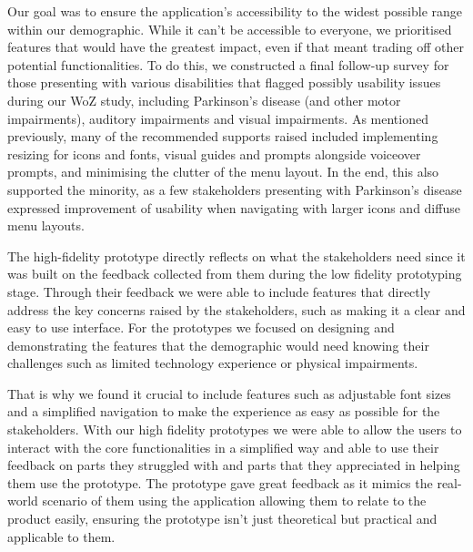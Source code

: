 \documentclass[12pt,a4paper]{article}
\begin{document}
Our goal was to ensure the application’s accessibility to the widest possible range within our demographic. While it can't be accessible to everyone, we prioritised features that would have the greatest impact, even if that meant trading off other potential functionalities. To do this, we constructed a final follow-up survey for those presenting with various disabilities that flagged possibly usability issues during our WoZ study, including Parkinson’s disease (and other motor impairments), auditory impairments and visual impairments. As mentioned previously, many of the recommended supports raised included implementing resizing for icons and fonts, visual guides and prompts alongside voiceover prompts, and minimising the clutter of the menu layout. In the end, this also supported the minority, as a few stakeholders presenting with Parkinson's disease expressed improvement of usability when navigating with larger icons and diffuse menu layouts. 

The high-fidelity prototype directly reflects on what the stakeholders need since it was built on the feedback collected from them during the low fidelity prototyping stage. Through their feedback we were able to include features that directly address the key concerns raised by the stakeholders, such as making it a clear and easy to use interface. For the prototypes we focused on designing and demonstrating the features that the demographic would need knowing their challenges such as limited technology experience or physical impairments. 

 That is why we found it crucial to include features such as adjustable font sizes and a simplified navigation to make the experience as easy as possible for the stakeholders. With our high fidelity prototypes we were able to allow the users to interact with the core functionalities in a simplified way and able to use their feedback on parts they struggled with and parts that they appreciated in helping them use the prototype. The prototype gave great feedback as it mimics the real-world scenario of them using the application allowing them to relate to the product easily, ensuring the prototype isn't just theoretical but practical and applicable to them.  
\end{document}
